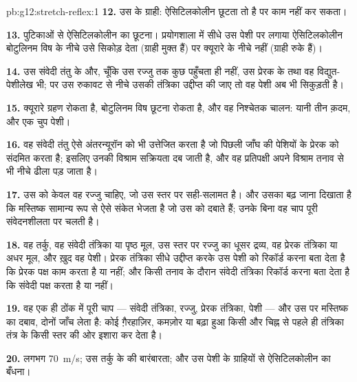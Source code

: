 \begin{solution}{pb:g12:stretch-reflex:1}
\textbf{12.} उस  के ग्राही: ऐसिटिलकोलीन छूटता तो है पर काम नहीं कर
सकता।

\textbf{13.} पुटिकाओं से ऐसिटिलकोलीन का छूटना। प्रयोगशाला में सीधे उस पेशी
पर लगाया ऐसिटिलकोलीन बोटुलिनम विष के नीचे उसे सिकोड़ देता (ग्राही मुक्त हैं)
पर क्यूरारे के नीचे नहीं (ग्राही रुके हैं)।

\textbf{14.} उस संवेदी तंतु के  और, चूँकि उस रज्जु तक कुछ पहुँचता
ही नहीं, उस प्रेरक  के तथा वह विद्युत-पेशीलेख भी; पर उस रुकावट से
नीचे उसकी तंत्रिका उद्दीप्त की जाए तो वह पेशी अब भी सिकुड़ती है।

\textbf{15.} क्यूरारे ग्रहण रोकता है, बोटुलिनम विष छूटना रोकता है, और वह
निश्चेतक चालन: यानी तीन क़दम, और एक चुप पेशी।

\textbf{16.} वह संवेदी तंतु ऐसे अंतरन्यूरॉन को भी उत्तेजित करता है जो पिछली
जाँघ की पेशियों के प्रेरक  को संदमित करता है; इसलिए उनकी विश्राम
सक्रियता दब जाती है, और वह प्रतिपक्षी अपने विश्राम तनाव से भी नीचे ढीला पड़
जाता है।

\textbf{17.} उस  को केवल वह रज्जु चाहिए, जो उस स्तर पर सही-सलामत
है। और उसका बढ़ जाना दिखाता है कि मस्तिष्क सामान्य रूप से ऐसे संकेत भेजता है
जो उस  को दबाते हैं; उनके बिना वह चाप पूरी संवेदनशीलता पर चलती है।

\textbf{18.} वह तर्कु, वह संवेदी तंत्रिका या पृष्ठ मूल, उस स्तर पर रज्जु का
धूसर द्रव्य, वह प्रेरक तंत्रिका या अधर मूल, और ख़ुद वह पेशी। प्रेरक
तंत्रिका सीधे उद्दीप्त करके उस पेशी को रिकॉर्ड करना बता देता है कि प्रेरक
पक्ष काम करता है या नहीं; और किसी तनाव के दौरान संवेदी तंत्रिका रिकॉर्ड करना
बता देता है कि संवेदी पक्ष करता है या नहीं।

\textbf{19.} वह एक ही ठोंक में पूरी चाप --- संवेदी तंत्रिका, रज्जु, प्रेरक
तंत्रिका, पेशी --- और उस पर मस्तिष्क का दबाव, दोनों जाँच लेता है: कोई
ग़ैरहाज़िर, कमज़ोर या बढ़ा हुआ  किसी और चिह्न से पहले ही तंत्रिका
तंत्र के किसी स्तर की ओर इशारा कर देता है।

\textbf{20.} लगभग \qty{70}{m/s}; उस तर्कु के  की बारंबारता; और
उस पेशी के ग्राहियों से ऐसिटिलकोलीन का बँधना।
\end{solution}
